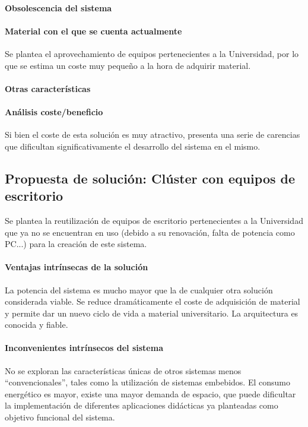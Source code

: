 \paragraph{Obsolescencia del sistema}

\paragraph{Material con el que se cuenta actualmente}
Se plantea el aprovechamiento de equipos pertenecientes a la Universidad, por lo que se estima un coste muy pequeño a la hora de adquirir material.
\paragraph{Otras características}

\paragraph{Análisis coste/beneficio}

Si bien el coste de esta solución es muy atractivo, presenta una serie de carencias que dificultan significativamente el desarrollo del sistema en el mismo. 


\subsection{Propuesta de solución: Clúster con equipos de escritorio}

Se plantea la reutilización de equipos de escritorio pertenecientes a la Universidad que ya no se encuentran en uso (debido a su renovación, falta de potencia como PC...) para la creación de este sistema.

\paragraph{Ventajas intrínsecas de la solución}
La potencia del sistema es mucho mayor que la de cualquier otra solución considerada viable. Se reduce dramáticamente el coste de adquisición de material y permite dar un nuevo ciclo de vida a material universitario.
La arquitectura es conocida y fiable.

\paragraph{Inconvenientes intrínsecos del sistema}

No se exploran las características únicas de otros sistemas menos ``convencionales'', tales como la utilización de sistemas embebidos. El consumo energético es mayor, existe una mayor demanda de espacio, que puede dificultar la implementación de diferentes aplicaciones didácticas ya planteadas como objetivo funcional del sistema.

